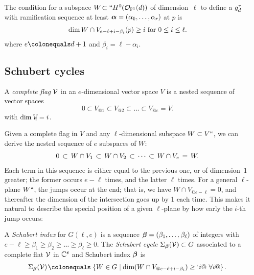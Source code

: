 \begin{proposition}\label{ramification1}
\!The condition for a subspace $W\!\subset``H^{0}(\sO_{\PP^{1}}(d))\mskip1mu$
of dimension~$\ell$
to define a $\grd$ with ramification sequence at least $\balpha
=(\alpha_{0},\dots, \alpha_{r})$ at $p$ is
$$
\dim W\cap V_{e-\ell+i-\beta_{i}}(p)\geq  i \hbox{ for } 0\leq i \leq
\ell.
$$
where $e\colonequals d+1$ and $\beta_{i} = \ell-\alpha_{i}$.
\end{proposition}

\subsection*{Schubert cycles}

\begin{definition}
A \emph{complete flag} $\cal V$  in an $e$-dimensional vector space $V$
%
is a nested sequence of vector spaces
$$
0 \subset V_{@1} \subset V_{@2} \subset \dots  \subset V_{@e} = V.
$$
with $\dim V_{\mskip-5mu i} = i$.
\end{definition}

Given a complete flag
in $V$ and any  $\ell$-dimensional subspace 
$W \subset V` `$, we can derive the nested sequence of $e$ subspaces of $W$:
$$
\let\;\,
0 \; \subset \; W \cap V_1 \; \subset \;  W \cap V_2 \; \subset \;
\cdots \; \subset \;  W \cap V_{e} \,=\, W
.
$$
Each term in this sequence is either equal to the 
previous
one, or of
dimension~1 greater; the former  occurs $e-\ell$ times, and the latter
$\ell$ times. For a general $\ell $-plane $W` `$, the jumps occur
at the end; that is, we have $W \cap V_{@e-\ell} = 0$, and thereafter
the dimension of the intersection goes up by 1 each time. This makes
it natural
to describe the special position of a given $\ell $-plane by how early
the $i$-th jump occurs:

\begin{definition}
A \emph{Schubert index} for $G(\ell, e)$ is a sequence ${\bbeta} =
(\beta_1,\dots,\beta_{\ell})$ of integers with $e-\ell \geq \beta_1 \geq
\beta_2 \geq \dots \geq \beta_{\ell} \geq 0$.
The \emph{Schubert cycle $\Sigma_{\bbeta}({\cal V}) \subset G$} associated
\label{Schubert1}
to a complete flat $\sV$ in $\CC^e$ and
Schubert index $\bbeta$  is
$$
\Sigma_{\bbeta}({\cal V}) \; \colonequals  \; \left\{ W \in G \mid \dim(W
\cap V_{@e-\ell+i-\beta_i}) \geq `i @\  \forall i@\right\} .
$$
\end{definition}

